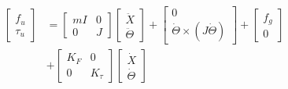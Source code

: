 \documentclass[journal,12pt,onecolumn,draftclsnofoot,]{IEEEtran}
\begin{document}
\begin{equation} \label{eq:uav} 
    \begin{split}
        \begin{bmatrix}
            f_u \\ \tau_u
        \end{bmatrix}&=\begin{bmatrix}
            mI & 0 \\ 0 & J
        \end{bmatrix}\begin{bmatrix}
            \ddot{X} \\ \ddot{\Theta}
        \end{bmatrix}+\begin{bmatrix}
            0 \\ \dot{\Theta}\times(J\dot{\Theta})
        \end{bmatrix}+\begin{bmatrix}
            f_g \\ 0
        \end{bmatrix}
        \\
        &+\begin{bmatrix}
            K_F & 0 \\
            0 & K_\tau
        \end{bmatrix}\begin{bmatrix}
            \dot{X} \\ \dot{\Theta}
        \end{bmatrix}
    \end{split}
\end{equation}
\end{document}
